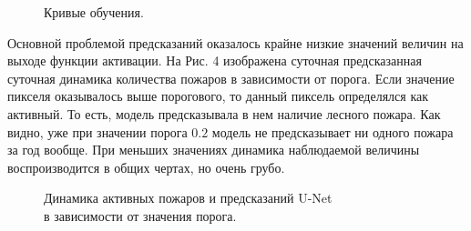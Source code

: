\documentclass[a4paper,article,14pt]{extarticle}
\begin{document}
\begin{figure}[ht]
\begin{center}
\caption{
\label{cinema}
	Кривые обучения.
}
\end {center}
\end {figure}

Основной проблемой предсказаний оказалось крайне низкие значений величин на выходе функции активации. На Рис. 4 изображена суточная предсказанная суточная динамика количества пожаров в зависимости от порога. Если значение пикселя оказывалось выше порогового, то данный пиксель определялся как активный. То есть, модель предсказывала в нем наличие лесного пожара. Как видно, уже при значении порога $0.2$ модель не предсказывает ни одного пожара за год вообще. При меньших значениях динамика наблюдаемой величины воспроизводится в общих чертах, но очень грубо.

\begin{figure}[ht]
\begin{center}
\caption{
\label{cinema}
	Динамика активных пожаров и предсказаний U-Net\\ в зависимости от значения порога.
}
\end {center}
\end {figure}
\end{document}
